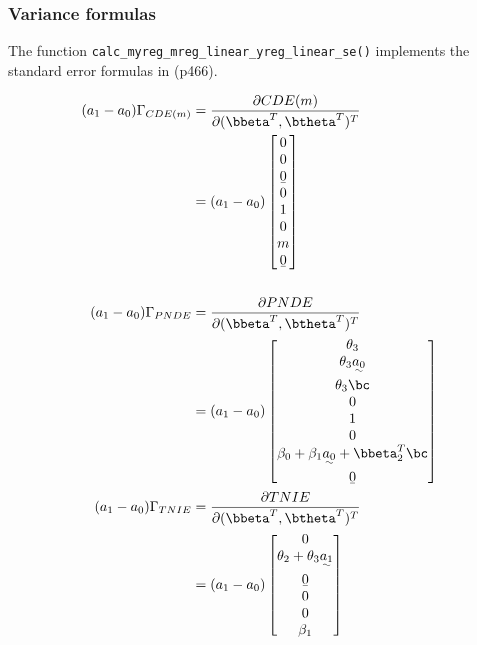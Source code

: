 \documentclass[dvipdfmx,10pt]{article}
\begin{document}
\subsubsection{Variance formulas}
\label{sec:org91a4080}
The function \texttt{calc\_myreg\_mreg\_linear\_yreg\_linear\_se()} implements the standard error formulas in \cite{vanderweeleExplanationCausalInference2015} (p466).

\begin{align*}
  (a_{1}-a_{0})\Gamma_{CDE(m)}
  &= \frac{\partial CDE(m)}{\partial (\bbeta^{T},\btheta^{T})^{T}}\\
  &= (a_{1}-a_{0})
    \begin{bmatrix}
      0\\
      0\\
      \b0\\
      0\\
      1\\
      0\\
      m\\
      \b0\\
    \end{bmatrix}\\
  \\
  (a_{1}-a_{0})\Gamma_{PNDE}
  &= \frac{\partial PNDE}{\partial (\bbeta^{T},\btheta^{T})^{T}}\\
  &= (a_{1}-a_{0})
    \begin{bmatrix}
      \theta_{3}\\
      \theta_{3}\uwave{a_{0}}\\
      \theta_{3}\bc\\
      0\\
      1\\
      0\\
      \beta_{0} + \beta_{1}\uwave{a_{0}} + \bbeta_{2}^{T}\bc\\
      \b0\\
    \end{bmatrix}\\
  (a_{1}-a_{0})\Gamma_{TNIE}
  &= \frac{\partial TNIE}{\partial (\bbeta^{T},\btheta^{T})^{T}}\\
  &= (a_{1}-a_{0})
    \begin{bmatrix}
      0\\
      \theta_{2} + \theta_{3}\uwave{a_{1}}\\
      \b0\\
      0\\
      0\\
      \beta_{1}\\

\end{bmatrix}
\end{align*}
\end{document}

